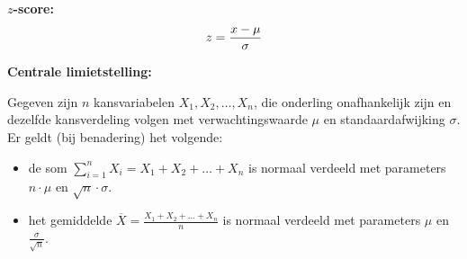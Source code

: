 \textbf{$z$-score:}
\[
    z = \frac{x - \mu}{\sigma}\\
\]

\textbf{Centrale limietstelling:}

Gegeven zijn $n$ kansvariabelen $X_1, X_2, \ldots, X_n$, die onderling onafhankelijk zijn en dezelfde kansverdeling volgen 
met verwachtingswaarde $\mu$ en standaardafwijking $\sigma$.
Er geldt (bij benadering) het volgende:
\begin{itemize}
    \item de som $\sum_{i=1}^{n} X_i = X_1 + X_2 + \ldots + X_n$ is normaal verdeeld met parameters $n \cdot \mu$ en $\sqrt{n} \cdot \sigma$.
    \item het gemiddelde $\overline{X} = \frac{X_1 + X_2 + \ldots + X_n}{n}$ is normaal verdeeld met parameters $\mu$ en $\frac{\sigma}{\sqrt{n}}$.
\end{itemize}

